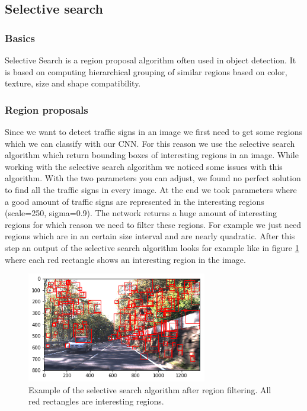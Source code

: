 \documentclass[12pt,a4paper,bibliography=totocnumbered,listof=totocnumbered]{scrartcl}
\begin{document}
\subsection{Selective search}

\subsubsection{Basics}
Selective Search is a region proposal algorithm often used in object detection. It is based on computing hierarchical grouping of similar regions based on color, texture, size and shape compatibility.

\subsubsection{Region proposals}
Since we want to detect traffic signs in an image we first need to get some regions which we can classify with our CNN. For this reason we use the selective search algorithm which return bounding boxes of interesting regions in an image. While working with the selective search algorithm we noticed some issues with this algorithm. With the two parameters you can adjust, we found no perfect solution to find all the traffic signs in every image. At the end we took parameters where a good amount of traffic signs are represented in the interesting regions (scale=250, sigma=0.9). The network returns a huge amount of interesting regions for which reason we need to filter these regions. For example we just need regions which are in an certain size interval and are nearly quadratic. After this step an output of the selective search algorithm looks for example like in figure \ref{fig:ss_example} where each red rectangle shows an interesting region in the image.

\begin{figure}[htbp] 
  \centering
     \includegraphics[width=0.7\textwidth]{ss_example}
  \caption{Example of the selective search algorithm after region filtering. All red rectangles are interesting regions.}
  \label{fig:ss_example}
\end{figure}
\end{document}
